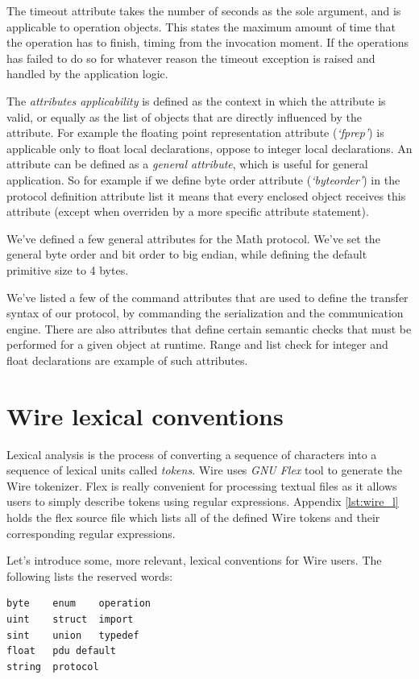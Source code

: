 \documentclass[times, utf8, diplomski]{fer}
\begin{document}
The timeout attribute takes the number of seconds as the sole argument, and is 
applicable to operation objects. This states the maximum amount of time that the 
operation has to finish, timing from the invocation moment. If the operations has 
failed to do so for whatever reason the timeout exception is raised and handled 
by the application logic.

The \emph{attributes applicability} is defined as the context in which the attribute 
is valid, or equally as the list of objects that are directly influenced by the 
attribute. For example the floating point representation attribute (\emph{`fp\textunderscore{}rep'})
 is applicable only to float local declarations, oppose to integer local declarations. 
An attribute can be defined as a \emph{general attribute}, which is useful for 
general application. So for example if we define byte order attribute 
(\emph{`byte\textunderscore{}order'}) in the protocol definition attribute list it means that 
every enclosed object receives this attribute (except when overriden by a more 
specific attribute statement).

We've defined a few general attributes for the Math protocol. We've set the 
general byte order and bit order to big endian, while defining the default 
primitive size to 4 bytes.

We've listed a few of the command attributes that are used to define the transfer 
syntax of our protocol, by commanding the serialization and the communication engine. 
There are also attributes that define certain semantic checks that must be performed 
for a given object at runtime. Range and list check for integer and float 
declarations are example of such attributes. 

\section{Wire lexical conventions}
Lexical analysis is the process of converting a sequence of characters into a 
sequence of lexical units called \emph{tokens}. Wire uses \emph{GNU Flex} tool 
to generate the Wire tokenizer. Flex is really convenient for processing textual 
files as it allows users to simply describe tokens using regular expressions. 
Appendix \ref{lst:wire_l} holds the flex source file which lists all of the defined 
Wire tokens and their corresponding regular expressions.

Let's introduce some, more relevant, lexical conventions for Wire users. The 
following lists the reserved words:
\lstset{language=IDL}
\lstset{basicstyle=\footnotesize}
\lstset{numbers=left, numberstyle=\tiny, stepnumber=1, numbersep=5pt}
\begin{lstlisting}[frame=tb]
byte	enum	operation
uint	struct	import
sint	union	typedef
float	pdu	default
string	protocol
\end{lstlisting}
\end{document}
